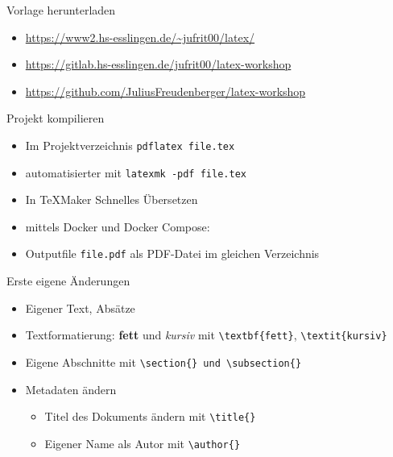 \documentclass[presentation,aspectratio=169]{beamer}
\begin{document}
\begin{frame}{Vorlage herunterladen}
  \begin{itemize}
    \item \href{https://www2.hs-esslingen.de/~jufrit00/latex/}{https://www2.hs-esslingen.de/\textasciitilde{}jufrit00/latex/}
    \item \href{https://gitlab.hs-esslingen.de/jufrit00/latex-workshop}{https://gitlab.hs-esslingen.de/jufrit00/latex-workshop}
    \item \href{https://github.com/JuliusFreudenberger/latex-workshop}{https://github.com/JuliusFreudenberger/latex-workshop}
  \end{itemize}
\end{frame}

\begin{frame}[fragile]{Projekt kompilieren}
  \begin{itemize}
    \item Im Projektverzeichnis \verb|pdflatex file.tex|
    \item automatisierter mit \verb|latexmk -pdf file.tex|
    \item In \TeX{}Maker \glqq{}Schnelles Übersetzen\grqq{}
    \item mittels Docker und Docker Compose: %
    \item Outputfile \verb|file.pdf| als PDF-Datei im gleichen Verzeichnis
  \end{itemize}
\end{frame}

\begin{frame}[fragile]{Erste eigene Änderungen}
  \begin{itemize}
    \item Eigener Text, Absätze
    \item Textformatierung: \textbf{fett} und \textit{kursiv} mit \verb|\textbf{fett}|, \verb|\textit{kursiv}|
    \item Eigene Abschnitte mit \verb|\section{} und \subsection{}|
    \item Metadaten ändern
      \begin{itemize}
        \item Titel des Dokuments ändern mit \verb|\title{}|
        \item Eigener Name als Autor mit \verb|\author{}|
      \end{itemize}
  \end{itemize}
\end{frame}
\end{document}
